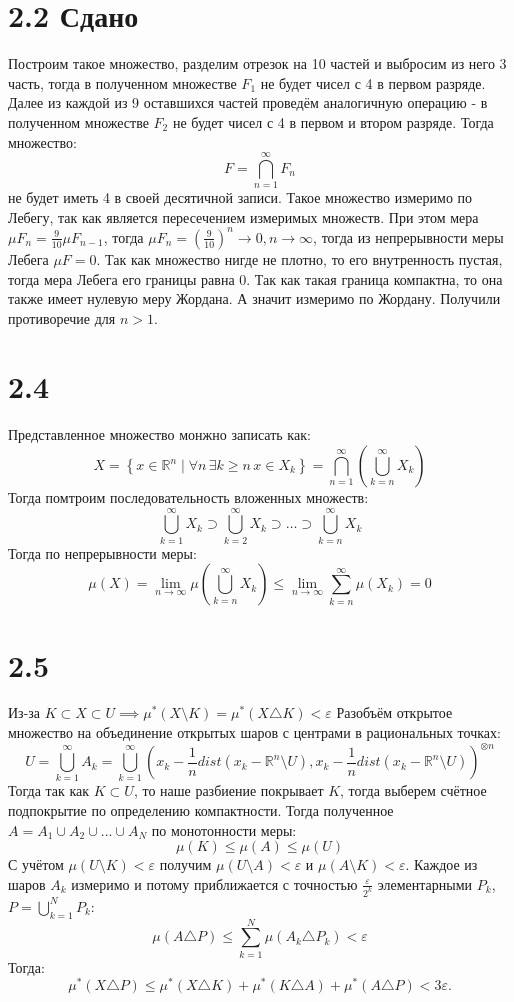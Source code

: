 \documentclass[12pt]{article}
\begin{document}
\section{2.2 Сдано}
Построим такое множество, разделим отрезок на 10 частей и выбросим из него 3 часть, тогда в полученном 
множестве $F_1$ не будет чисел с 4 в первом разряде. Далее из каждой из 9 оставшихся частей проведём аналогичную операцию - 
в полученном множестве $F_2$ не будет чисел с 4 в первом и втором разряде. Тогда множество:
\[
    F = \bigcap_{n=1}^{\infty} F_n
\]  
не будет иметь 4 в своей десятичной записи. Такое множество измеримо по Лебегу, так как является 
пересечением измеримых множеств. При этом мера $\mu F_n = \frac{9}{10} \mu F_{n-1}$, тогда 
$\mu F_n = \left( \frac{9}{10} \right)^n \to 0, n \to \infty$, тогда из непрерывности меры Лебега 
$\mu F = 0$. Так как множество нигде не плотно, то его внутренность пустая, тогда мера Лебега его 
границы равна $0$. Так как такая граница компактна, то она также имеет нулевую меру Жордана. А значит измеримо по 
Жордану.    
Получили противоречие для $n > 1$. 
\section{2.4}
Представленное множество монжно записать как:
\[
    X = \left\{ x \in \mathbb{R}^n \mid \forall n \, \exists k \geq n \, x \in X_k \right\}  = \bigcap_{n=1}^{\infty} \left( \bigcup_{k=n}^{\infty} X_k \right) 
\] 
Тогда помтроим последовательность вложенных множеств: 
\[
    \bigcup_{k=1}^{\infty} X_k \supset \bigcup_{k=2}^{\infty} X_k \supset \dots \supset \bigcup_{k=n}^{\infty} X_k
\]
Тогда по непрерывности меры: 
\[
    \mu(X) = \lim_{n \to \infty} \mu \left( \bigcup_{k=n}^{\infty} X_k \right) \leq \lim_{n \to \infty} \sum_{k=n}^{\infty} \mu(X_k) = 0
\]


\section{2.5}
Из-за $K \subset X \subset U \implies \mu^{\ast} (X \setminus K) = \mu^{\ast} (X \triangle K) < \varepsilon$ 
Разобъём открытое множество на объединение открытых шаров с центрами в рациональных точках: 
\[
    U = \bigcup_{k=1}^{\infty} A_k =  \bigcup_{k=1}^{\infty} (x_k - \frac{1}{n} dist(x_k - \mathbb{R}^n \setminus U), x_k - \frac{1}{n} dist(x_k - \mathbb{R}^n \setminus U))^{\otimes n}
\]
Тогда так как $K \subset U$, то наше разбиение покрывает $K$, тогда выберем счётное подпокрытие по определению 
компактности. Тогда полученное $A = A_1 \cup A_2 \cup \dots \cup A_N$ по монотонности меры: 
\[
    \mu(K) \leq \mu(A) \leq \mu(U)
\]
С учётом $\mu(U \setminus K) < \varepsilon$ получим $\mu(U \setminus A) < \varepsilon$ и $\mu(A \setminus K) < \varepsilon$. 
Каждое из шаров $A_k$ измеримо и потому приближается с точностью $\frac{\varepsilon}{2^k}$ элементарными $P_k$, $P = \bigcup_{k=1}^{N} P_k$: 
\[
    \mu(A \triangle P) \leq \sum_{k=1}^{N} \mu(A_k \triangle P_k) < \varepsilon
\]
Тогда: 
\[
    \mu^{\ast} (X \triangle P) \leq \mu^{\ast} (X \triangle K) + \mu^{\ast} (K \triangle A) + \mu^{\ast} (A \triangle P) < 3 \varepsilon.
\]
\end{document}
